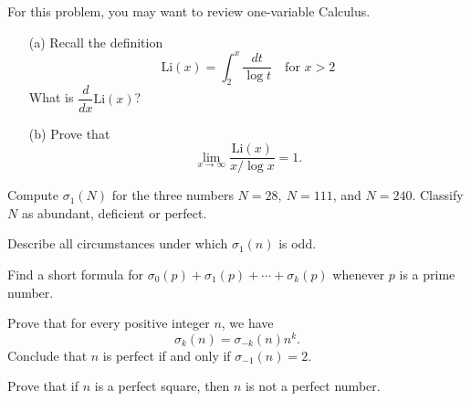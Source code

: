 \begin{problem}\label{problem 4.1}
For this problem, you may want to review one-variable Calculus.
\begin{itemize}
\item[(a)] Recall the definition 
\[\mathrm{Li}(x) = \int_2^x \frac{dt}{\log t}\quad \text{for } x > 2\]
What is $\dfrac{d}{dx}\mathrm{Li}(x)$?
\item[(b)] Prove that \[\lim_{x\to \infty}\frac{\mathrm{Li}(x)}{x/\log x} = 1.\]
\end{itemize}
\end{problem}

\vspace*{0.1in}

\begin{problem}\label{problem 4.2}
Compute $\sigma_1(N)$ for the three numbers $N = 28,\ N = 111$, and $N = 240$. Classify $N$ as abundant, deficient or perfect.
\end{problem}

\vspace*{0.1in}

\begin{problem}[Mersenne, 1644]\label{problem 4.3}
Describe all circumstances under which $\sigma_1(n)$ is odd.
\end{problem}

\vspace*{0.1in}

\begin{problem}\label{problem 4.4}
Find a short formula for $\sigma_0(p) + \sigma_1(p) + \cdots + \sigma_k(p)$ whenever $p$ is a prime number.
\end{problem}

\vspace*{0.1in}

\begin{problem}\label{problem 4.5}
Prove that for every positive integer $n$, we have
\[\sigma_k(n) = \sigma_{-k}(n)n^k.\]
Conclude that $n$ is perfect if and only if $\sigma_{-1}(n) = 2$.
\end{problem}

\vspace*{0.1in}

\begin{problem}\label{problem 4.6}
Prove that if $n$ is a perfect square, then $n$ is not a perfect number.
\end{problem}

\vspace*{0.1in}

